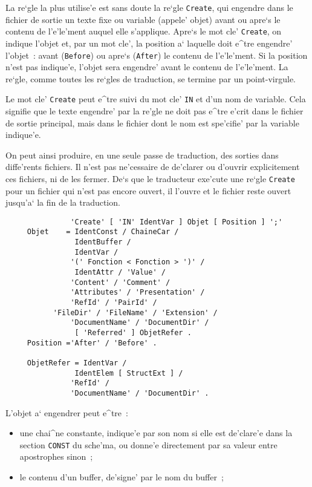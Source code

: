 {La re`gle la plus utilise'e est sans doute la re`gle {\tt Create}, qui
engendre dans le fichier de sortie un texte fixe ou variable (appele' objet)
avant ou apre`s le contenu de l'e'le'ment auquel elle s'applique. Apre`s le
mot cle' {\tt Create}, on indique l'objet et, par un mot cle', la position a`
laquelle doit e^tre engendre' l'objet~: avant ({\tt Before}) ou apre`s
({\tt After}) le contenu de l'e'le'ment. Si la position n'est pas indique'e,
l'objet sera engendre' avant le contenu de l'e'le'ment. La re`gle, comme
toutes les re`gles de traduction, se termine par un point-virgule.

Le mot cle' {\tt Create} peut e^tre suivi du mot cle' {\tt IN} et d'un
nom de variable. Cela signifie que le texte engendre' par la re'gle ne
doit pas e^tre e'crit dans le fichier de sortie principal, mais dans le
fichier dont le nom est spe'cifie' par la variable indique'e.

On peut ainsi produire, en une seule passe de traduction, des sorties dans
diffe'rents fichiers. Il n'est pas ne'cessaire de de'clarer ou d'ouvrir
explicitement ces fichiers, ni de les fermer. De`s que le traducteur
exe'cute une re`gle {\tt Create} pour un fichier qui n'est pas encore
ouvert, il l'ouvre et le fichier reste ouvert jusqu'a` la fin de la
traduction.

\begin{verbatim}
               'Create' [ 'IN' IdentVar ] Objet [ Position ] ';'
     Objet    = IdentConst / ChaineCar /
                IdentBuffer /
                IdentVar /
               '(' Fonction < Fonction > ')' /
                IdentAttr / 'Value' /
               'Content' / 'Comment' / 
               'Attributes' / 'Presentation' /
               'RefId' / 'PairId' /
	       'FileDir' / 'FileName' / 'Extension' /
               'DocumentName' / 'DocumentDir' /
                [ 'Referred' ] ObjetRefer .
     Position ='After' / 'Before' .

     ObjetRefer = IdentVar /
                IdentElem [ StructExt ] /
               'RefId' /
               'DocumentName' / 'DocumentDir' .
\end{verbatim}

L'objet a` engendrer peut e^tre~:
\begin{itemize}
\item une chai^ne constante, indique'e par son nom si elle est de'clare'e dans
 la section {\tt CONST} du sche'ma, ou donne'e directement par sa valeur entre
 apostrophes sinon~;

\item le contenu d'un buffer, de'signe' par le nom du buffer~;


\end{itemize}}
